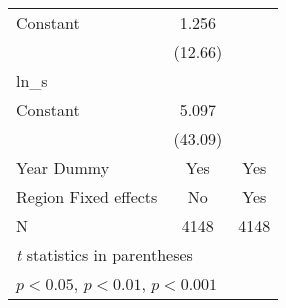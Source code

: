 {\begin{longtable}{l*{2}{c}}
Constant            &       1.256\sym{***}&                     \\
                    &     (12.66)         &                     \\
\hline
ln\_s                &                     &                     \\
Constant            &       5.097\sym{***}&                     \\
                    &     (43.09)         &                     \\
[1em]
Year Dummy          &         Yes         &         Yes         \\
\hline
Region Fixed effects&          No         &         Yes         \\
N                   &        4148         &        4148         \\
\hline\hline
\multicolumn{3}{l}{\footnotesize \textit{t} statistics in parentheses}\\
\multicolumn{3}{l}{\footnotesize \sym{*} \(p<0.05\), \sym{**} \(p<0.01\), \sym{***} \(p<0.001\)}\\
\end{longtable}
}
